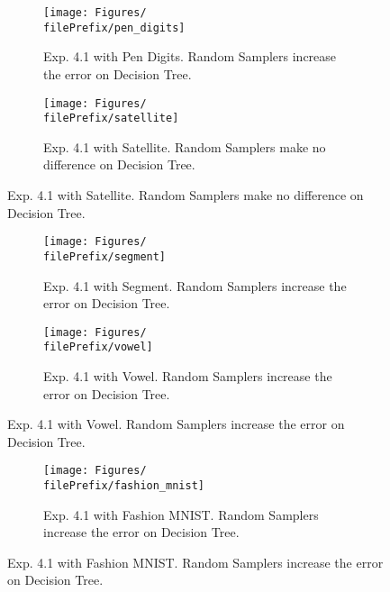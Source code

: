 \begin{figure}[ht]
  \centering
  \begin{subfigure}[t]{0.5\linewidth}
    \centering\captionsetup{width=.8\linewidth}\texttt{[image: Figures/\\filePrefix/pen\_digits]}
    \caption{Exp. 4.1 with Pen Digits. Random Samplers increase the error on Decision Tree.}
    \label{fig:\undPrefix_pen_digits}
  \end{subfigure}%
  \begin{subfigure}[t]{0.5\linewidth}
    \centering\captionsetup{width=.8\linewidth}\texttt{[image: Figures/\\filePrefix/satellite]}
    \caption{Exp. 4.1 with Satellite. Random Samplers make no difference on Decision Tree.}
    \label{fig:\undPrefix_satellite}
  \end{subfigure}
\end{figure}

\begin{figure}[ht]
  \centering
  \begin{subfigure}[t]{0.5\linewidth}
    \centering\captionsetup{width=.8\linewidth}\texttt{[image: Figures/\\filePrefix/segment]}
    \caption{Exp. 4.1 with Segment. Random Samplers increase the error on Decision Tree.}
    \label{fig:\undPrefix_segment}
  \end{subfigure}%
  \begin{subfigure}[t]{0.5\linewidth}
    \centering\captionsetup{width=.8\linewidth}\texttt{[image: Figures/\\filePrefix/vowel]}
    \caption{Exp. 4.1 with Vowel. Random Samplers increase the error on Decision Tree.}
    \label{fig:\undPrefix_vowel}
  \end{subfigure}
\end{figure}


\begin{figure}[ht]
  \centering
  \begin{subfigure}[t]{0.5\linewidth}
    \centering\captionsetup{width=.8\linewidth}\texttt{[image: Figures/\\filePrefix/fashion\_mnist]}
    \caption{Exp. 4.1 with Fashion MNIST. Random Samplers increase the error on Decision Tree.}
    \label{fig:\undPrefix_segment}
  \end{subfigure}%
\end{figure}


\let\major\undefined
\let\minor\undefined

\let\undPrefix\undefined
\let\dotPrefix\undefined
\let\scoPrefix\undefined

\let\filePrefix\undefined
